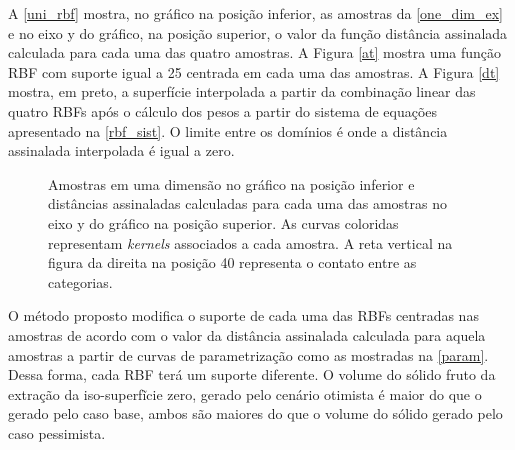 A \autoref{uni_rbf} mostra, no gráfico na posição inferior, as amostras da \autoref{one_dim_ex} e no eixo y do gráfico, na posição superior, o valor da função distância assinalada calculada para cada uma das quatro amostras. A Figura \autoref{at} mostra uma função RBF com suporte igual a 25 centrada em cada uma das amostras. A Figura \autoref{dt} mostra, em preto, a superfície interpolada a partir da combinação linear das quatro RBFs após o cálculo dos pesos a partir do sistema de equações apresentado na \autoref{rbf_sist}. O limite entre os domínios é onde a distância assinalada interpolada é igual a zero.

\begin{figure}[H]
    \centering
    \caption{Amostras em uma dimensão no gráfico na posição inferior e distâncias assinaladas calculadas para cada uma das amostras no eixo y do gráfico na posição superior. As curvas coloridas representam \textit{kernels} associados a cada amostra. A reta vertical na figura da direita na posição 40 representa o contato entre as categorias.} \label{uni_rbf}
     \hspace{1em}
\end{figure}

O método proposto modifica o suporte de cada uma das RBFs centradas nas amostras de acordo com o valor da distância assinalada calculada para aquela amostras a partir de curvas de parametrização como as mostradas na \autoref{param}. Dessa forma, cada RBF terá um suporte diferente. O volume do sólido fruto da extração da iso-superfĩcie zero, gerado pelo cenário otimista é maior do que o gerado pelo caso base, ambos são maiores do que o volume do sólido gerado pelo caso pessimista.

